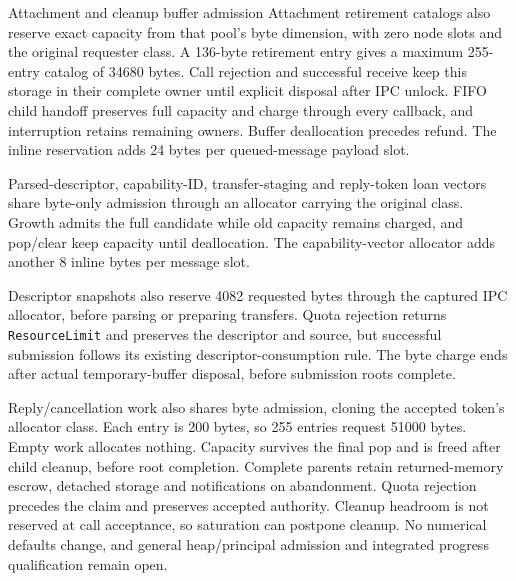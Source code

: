 \begin{implementationdetail}{Attachment and cleanup buffer admission}
Attachment retirement catalogs also reserve exact capacity from that pool's
byte dimension, with zero node slots and the original requester class. A
136-byte retirement entry gives a maximum 255-entry catalog of 34680 bytes.
Call rejection and successful receive keep this storage in their complete owner
until explicit disposal after IPC unlock. FIFO child handoff preserves full
capacity and charge through every callback, and interruption retains remaining
owners. Buffer deallocation precedes refund. The inline reservation adds 24 bytes
per queued-message payload slot.

Parsed-descriptor, capability-ID,
transfer-staging and reply-token loan vectors share byte-only admission through
an allocator carrying the original class. Growth admits the full candidate while
old capacity remains charged, and pop/clear keep capacity until deallocation.
The capability-vector allocator adds another 8 inline bytes per message slot.

Descriptor snapshots also reserve 4082 requested bytes through the captured IPC
allocator, before parsing or preparing transfers. Quota rejection returns
\texttt{ResourceLimit} and preserves the descriptor and source, but successful
submission follows its existing descriptor-consumption rule. The byte charge
ends after actual temporary-buffer disposal, before submission roots complete.

Reply/cancellation work also shares byte admission, cloning the accepted token's
allocator class. Each entry is 200 bytes, so 255 entries request 51000 bytes. Empty
work allocates nothing. Capacity survives the final pop and is freed after child
cleanup, before root completion. Complete parents retain returned-memory escrow,
detached storage and notifications on abandonment. Quota rejection precedes the
claim and preserves accepted authority. Cleanup headroom is not reserved at call
acceptance, so saturation can postpone cleanup. No numerical defaults change, and
general heap/principal admission and integrated progress qualification remain open.
\end{implementationdetail}

